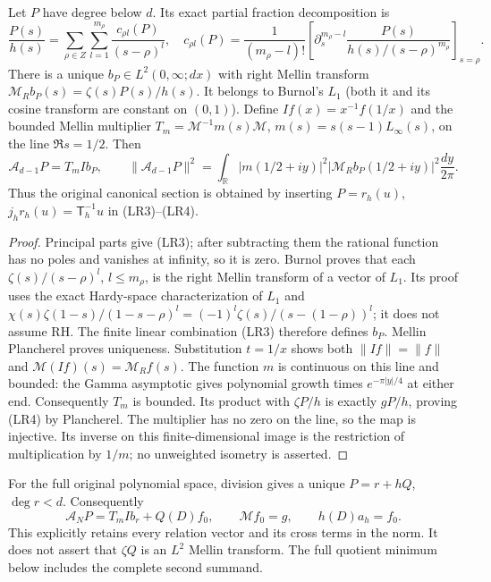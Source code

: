 \begin{hzocproposition}
Let $P$ have degree below $d$. Its exact partial fraction decomposition is
\[
 \frac{P(s)}{h(s)}=\sum_{\rho\in Z}\sum_{l=1}^{m_\rho}
 \frac{c_{\rho l}(P)}{(s-\rho)^l},\quad
 c_{\rho l}(P)=\frac1{(m_\rho-l)!}
 \left[\partial_s^{m_\rho-l}\frac{P(s)}{h(s)/(s-\rho)^{m_\rho}}
 \right]_{s=\rho}.\tag{LR3}
\]
There is a unique $b_P\in L^2(0,\infty;dx)$ with right Mellin transform
$\mathcal M_Rb_P(s)=\zeta(s)P(s)/h(s)$. It belongs to Burnol's
$L_1$ (both it and its cosine transform are constant on $(0,1)$).
Define $If(x)=x^{-1}f(1/x)$ and the bounded Mellin multiplier
$T_m=\mathcal M^{-1}m(s)\mathcal M$, $m(s)=s(s-1)L_\infty(s)$,
on the line $\Re s=1/2$. Then
\[
 \mathcal A_{d-1}P=T_m I b_P,\qquad
 \|\mathcal A_{d-1}P\|^2=
 \int_{\mathbb R}|m(1/2+iy)|^2
 |\mathcal M_Rb_P(1/2+iy)|^2\frac{dy}{2\pi}.\tag{LR4}
\]
Thus the original canonical section is obtained by inserting
$P=r_h(u)$, $j_hr_h(u)=\mathsf T_h^{-1}u$ in (LR3)--(LR4).
\end{hzocproposition}
\begin{proof}
Principal parts give (LR3); after subtracting them the rational function
has no poles and vanishes at infinity, so it is zero. Burnol
\cite[\S4, Proposition \texttt{zetaprop} and its proof]{hzoc:Burnol}
proves that each $\zeta(s)/(s-\rho)^l$, $l\le m_\rho$, is the
right Mellin transform of a vector of $L_1$. Its proof uses the exact
Hardy-space characterization of $L_1$ and
$\chi(s)\zeta(1-s)/(1-s-\rho)^l
=(-1)^l\zeta(s)/(s-(1-\rho))^l$; it does not assume RH.
The finite linear combination (LR3) therefore defines $b_P$.
Mellin Plancherel proves uniqueness.
Substitution $t=1/x$ shows both $\|If\|=\|f\|$ and
$\mathcal M(If)(s)=\mathcal M_Rf(s)$. The function $m$ is continuous
on this line and bounded: the Gamma asymptotic
\cite[5.11.9]{hzoc:DLMF5} gives polynomial growth times
$e^{-\pi|y|/4}$ at either end. Consequently $T_m$ is bounded.
Its product with $\zeta P/h$ is exactly $gP/h$, proving (LR4) by
Plancherel. The multiplier has no zero on the line, so the map is
injective. Its inverse on this finite-dimensional image is the
restriction of multiplication by $1/m$; no unweighted isometry is asserted.
\end{proof}

For the full original polynomial space, division gives a unique
$P=r+hQ$, $\deg r<d$. Consequently
\[
 \mathcal A_NP=T_m I b_r+Q(D)f_0,\qquad
 \mathcal M f_0=g,\qquad h(D)a_h=f_0.\tag{LR5}
\]
This explicitly retains every relation vector and its cross terms in
the norm. It does not assert that $\zeta Q$ is an $L^2$ Mellin transform.
The full quotient minimum below includes the complete second summand.

